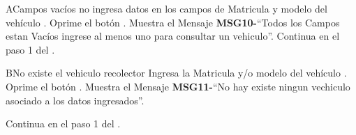 	\begin{UCtrayectoriaA}{A}{Campos vacíos}
	\UCpaso [\UCactor] no ingresa datos en los campos de  Matricula y modelo del vehículo  .
	\UCpaso[\UCactor] Oprime el botón .
	\UCpaso Muestra el Mensaje {\bf MSG10-}``Todos  los Campos estan  Vacíos ingrese al menos uno para consultar un vehiculo''.
	\UCpaso Continua en el paso 1 del .
\end{UCtrayectoriaA}

\begin{UCtrayectoriaA}{B}{No existe el vehiculo recolector }
	\UCpaso [\UCactor] Ingresa la Matricula y/o modelo del vehículo  .
	\UCpaso[\UCactor] Oprime el botón .
	\UCpaso Muestra el Mensaje {\bf MSG11-}``No hay existe ningun vechiculo asociado a los datos ingresados''.

	\UCpaso Continua en el paso 1 del .
\end{UCtrayectoriaA}


		
